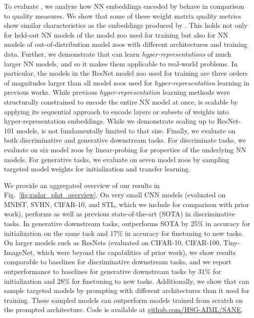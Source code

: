 %
To evaluate \ourmethod, we analyze how NN embeddings encoded by \ourmethod behave in comparison to \citet{martinRethinkingGeneralizationRequires2019,martinImplicitSelfregularizationDeep2021} quality measures. 
We show that some of these weight matrix quality metrics show similar characteristics as the embeddings produced by \ourmethod. 
This holds not only for held-out NN models of the model zoo used for training \ourmethod but also for NN models of out-of-distribution model zoos with different architectures and training data.
% 
Further, we demonstrate that \ourmethod can learn \textit{hyper-representations} of much larger NN models, and so it makes them applicable to real-world problems. 
%
In particular, the models in the ResNet model zoo used for training are three orders of magnitudes larger than all model zoos used for \textit{hyper-representation} learning in previous works. 
While previous \textit{hyper-representation} learning methods were structurally constrained to encode the entire NN model at once, \ourmethod is scalable by applying its sequential approach to encode layers or subsets of weights into hyper-representation embeddings.
While we demonstrate scaling up to ResNet-101 models, \ourmethod is not fundamentally limited to that size.
%
Finally, we evaluate \ourmethod on both discriminative and generative downstream tasks.
For discriminate tasks, we evaluate on six model zoos by linear-probing for properties of the underlying NN models. 
For generative tasks, we evaluate on seven model zoos by sampling targeted model weights for initialization and transfer learning. 

We provide an aggregated overview of our results in Fig.~\ref{fig:radar_plot_overview}. 
On very small CNN models (evaluated on MNIST, SVHN, CIFAR-10, and STL, which we include for comparison with prior work), \ourmethod performs as well as previous state-of-the-art (SOTA) in discriminative tasks. In generative downstream tasks, \ourmethod outperforms SOTA by 25\% in accuracy for initialization on the same task and 17\% in accuracy for finetuning to new tasks.
%
On larger models such as ResNets (evaluated on CIFAR-10, CIFAR-100, Tiny-ImageNet, which were beyond the capabilities of prior work), we show results comparable to baselines for discriminative downstream tasks, and we report outperformance to baselines for generative downstream tasks by 31\% for initialization and 28\% for finetuning to new tasks. 
%
Additionally, we show that \ourmethod can sample targeted models by prompting with different architectures than it used for training. These sampled models can outperform models trained from scratch on the prompted architecture. Code is available at \href{https://github.com/HSG-AIML/SANE}{github.com/HSG-AIML/SANE}.

